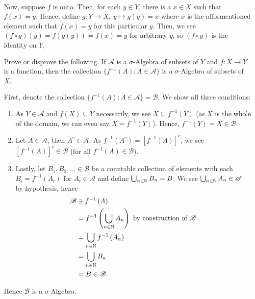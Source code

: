 \documentclass[a4paper]{article}
\begin{document}
\begin{solution}
\begin{enumerate}
	\\		Now, suppose \(f\) is onto. Then, for each \(y \in Y\), there is a \(x \in X\) such that \(f\left( x \right)  =y\). Hence, define \(g: Y \to X, \ y \mapsto g(y) = x\) where \(x\) is the afformentioned element such that \(f\left( x \right) =y\) for this particular \(y\). Then, we see \(\left( f \circ g \right) \left( y \right) = f\left( g\left( y \right)  \right) = f\left( x \right) = y\) for arbitrary \(y\), so \(\left( f \circ g \right) \) is the identity on \(Y\),
	\end{enumerate}
\end{solution}
\newpage
\begin{problem}[4]
	Prove or disprove the following. If \(\mathscr{A}\) is a \(\sigma\)-Algebra of subsets of \(Y\) and \(f: X \to Y\) is a function, then the collection \(\{f^{-1} \left( A \right) : A \in \mathscr{A}\} \) is a \(\sigma\)-Algebra of subsets of \(X\).
\end{problem}
\begin{solution}
	First, denote the collection \(\{f^{-1}\left( A \right) : A \in \mathscr{A}\} = \mathscr{B}\). We show all three conditions:
	\begin{enumerate}
		\item As \(Y \in \mathscr{A}\) and \(f\left( X \right) \subseteq Y\) necessarily, we see \(X \subseteq f^{-1} \left( Y \right) \) (as \(X\) is the whole of the domain, we can even say \(X = f^{-1}\left( Y \right) \)). Hence, \(f^{-1}\left( Y \right) = X \in \mathscr{B}\).
		\item Let \(A \in \mathscr{A}\), then \(A^{c} \in \mathscr{A}\). As \(f^{-1}\left( A^{c} \right) = \left[ f^{-1}\left( A \right)  \right] ^{c} \), we see \(\left[ f^{-1}\left( A \right)  \right] ^{c} \in \mathscr{B}\) (for all \(f^{-1}\left( A \right) \in \mathscr{B}\)).
		\item Lastly, let \(B_1, B_2, \ldots \in \mathscr{B}\) be a countable collection of elements with each \(B_{i} = f^{-1}\left( A_{i} \right) \) for \(A_{i} \in \mathscr{A}\) and define \(\bigcup_{n \in \mathbb{N}} B_{n} = B\). We see \(\bigcup_{n \in \mathbb{N}} A_{n} \in \mathscr{A}\) by hypothesis, hence
			\begin{align*}
				\mathscr{B} &\ni f^{-1}\left( A \right) \\
				&= f^{-1}\left( \bigcup_{n \in \mathbb{N}} A_{n} \right) \text{ by construction of \(\mathscr{B}\)}\\
					    &= \bigcup_{n \in \mathbb{N}} f^{-1}\left( A_{n} \right)  \\
					    &= \bigcup_{n\in \mathbb{N}} B_{n} \\
					    &= B \in \mathscr{B}
			.\end{align*}
	\end{enumerate}
	Hence \(\mathscr{B}\) is a \(\sigma\)-Algebra.
\end{solution}
\end{document}
